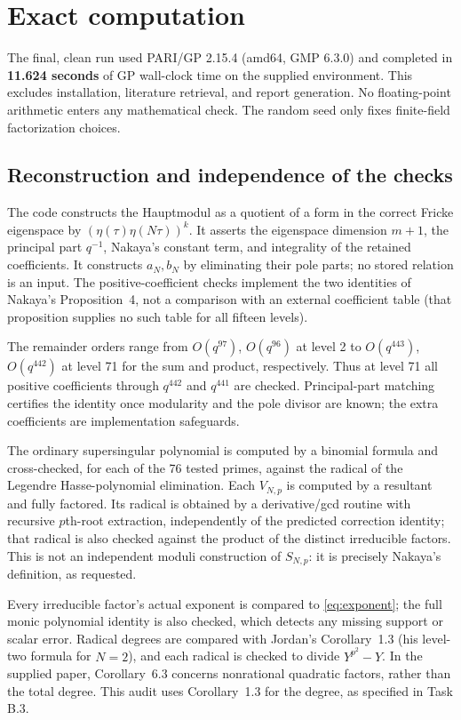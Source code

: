 \documentclass[11pt,a4paper]{article}
\begin{document}
\section{Exact computation}
The final, clean run used PARI/GP 2.15.4 (amd64, GMP 6.3.0) and completed in \textbf{11.624 seconds} of GP wall-clock time on the supplied environment. This excludes installation, literature retrieval, and report generation. No floating-point arithmetic enters any mathematical check. The random seed only fixes finite-field factorization choices.



\subsection{Reconstruction and independence of the checks}
The code constructs the Hauptmodul as a quotient of a form in the correct Fricke eigenspace by $(\eta(\tau)\eta(N\tau))^k$. It asserts the eigenspace dimension $m+1$, the principal part $q^{-1}$, Nakaya's constant term, and integrality of the retained coefficients. It constructs $a_N,b_N$ by eliminating their pole parts; no stored relation is an input. The positive-coefficient checks implement the two identities of Nakaya's Proposition~4, not a comparison with an external coefficient table (that proposition supplies no such table for all fifteen levels).

The remainder orders range from $O(q^{97})$, $O(q^{96})$ at level 2 to $O(q^{443})$, $O(q^{442})$ at level 71 for the sum and product, respectively. Thus at level 71 all positive coefficients through $q^{442}$ and $q^{441}$ are checked. Principal-part matching certifies the identity once modularity and the pole divisor are known; the extra coefficients are implementation safeguards.

The ordinary supersingular polynomial is computed by a binomial formula and cross-checked, for each of the 76 tested primes, against the radical of the Legendre Hasse-polynomial elimination. Each $V_{N,p}$ is computed by a resultant and fully factored. Its radical is obtained by a derivative/gcd routine with recursive $p$th-root extraction, independently of the predicted correction identity; that radical is also checked against the product of the distinct irreducible factors. This is not an independent moduli construction of $S_{N,p}$: it is precisely Nakaya's definition, as requested.

Every irreducible factor's actual exponent is compared to \eqref{eq:exponent}; the full monic polynomial identity is also checked, which detects any missing support or scalar error. Radical degrees are compared with Jordan's Corollary~1.3 (his level-two formula for $N=2$), and each radical is checked to divide $Y^{p^2}-Y$. In the supplied paper, Corollary~6.3 concerns nonrational quadratic factors, rather than the total degree. This audit uses Corollary~1.3 for the degree, as specified in Task B.3.
\end{document}
